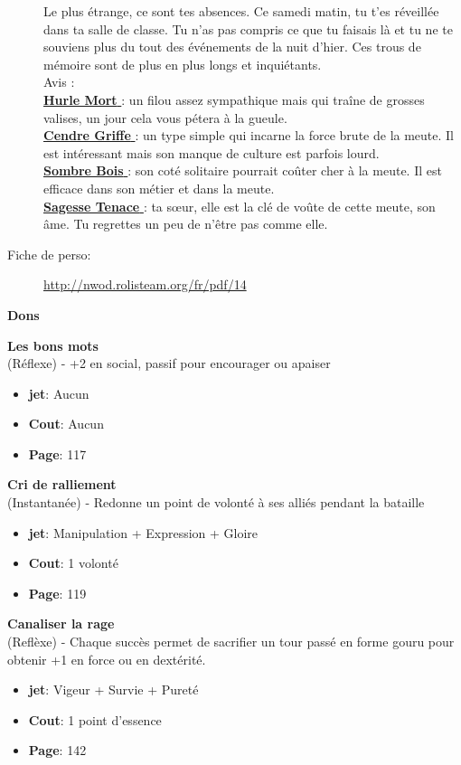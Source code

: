 \documentclass[oneside,12pt]{book}
\newcommand\don[6]{
\textbf{#1} \\
(#6) - #2
\begin{itemize}
\item{ \textbf{jet}: #3}
\item{ \textbf{Cout}: #4}
\item{ \textbf{Page}: #5}
\end{itemize}
\vspace{0.5cm}
}
\newcommand{\Jessica}{\textbf{Sagesse Tenace} }
\newcommand{\Luke}{\textbf{Cendre Griffe} }
\newcommand{\Peter}{\textbf{Hurle Mort} }
\newcommand{\Leonard}{\textbf{Sombre Bois} }
\begin{document}
\begin{flushleft}
\begin{description}
{Le plus étrange, ce sont tes absences. Ce samedi matin, tu t’es réveillée dans ta salle de classe. Tu n’as pas compris ce que tu faisais là et tu ne te souviens plus du tout des événements de la nuit d’hier. Ces trous de mémoire sont de plus en plus longs et inquiétants.\\
Avis :\\
\underline{\Peter} : un filou assez sympathique mais qui traîne de grosses valises, un jour cela vous pétera à la gueule.\\
\underline{\Luke} : un type simple qui incarne la force brute de la meute. Il est intéressant mais son manque de culture est parfois lourd.\\
\underline{\Leonard} : son coté solitaire pourrait coûter cher à la meute. Il est efficace dans son métier et dans la meute.\\
\underline{\Jessica}: ta sœur, elle est la clé de voûte de cette meute, son âme. Tu regrettes un peu de n'être pas comme elle.\\
}
\item[Fiche de perso:]{\href{http://nwod.rolisteam.org/fr/pdf/14}{http://nwod.rolisteam.org/fr/pdf/14}}
\end{description}

\clearpage
\textbf{\large Dons} 
\vspace{0.5cm}

\don{Les bons mots}{+2 en social, passif pour encourager ou apaiser}{Aucun}{Aucun}{117}{Réflexe}
\don{Cri de ralliement}{Redonne un point de volonté à ses alliés pendant la bataille}{Manipulation + Expression + Gloire}{1 volonté}{119}{Instantanée}
\don{Canaliser la rage}{Chaque succès permet de sacrifier un tour passé en forme gouru pour obtenir +1 en force ou en dextérité.}{Vigeur + Survie + Pureté}{1 point d'essence}{142}{Reflèxe}

\clearpage

\end{flushleft}
\end{document}
